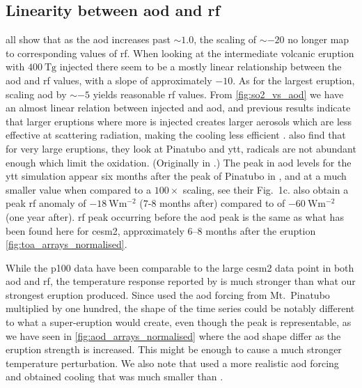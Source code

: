 \documentclass{ametsocV5}
\newcommand{\iso}[1][i]{{#1}njected \ce{SO2}}
\begin{document}
\subsection{Linearity between \ac{aod} and \ac{rf}}

 all show
that as the \ac{aod} increases past \(\sim 1.0\), the scaling of \(\sim -20\) no longer
map to corresponding values of \ac{rf}. When looking at the intermediate volcanic
eruption with \(\SI{400}{\tera\gram}\) \iso{} there seem to be a mostly linear
relationship between the \ac{aod} and \ac{rf} values, with a slope of approximately
\(-10\). As for the largest eruption, scaling \ac{aod} by \(\sim-5\) yields reasonable
\ac{rf} values. From \cref{fig:so2_vs_aod} we have an almost linear relation between
\iso{} and \ac{aod}, and previous results indicate that larger eruptions where more
 is injected creates larger aerosols which are less effective at scattering
radiation, making the cooling less efficient
\citep{english2013,timmreck2010,timmreck2018}. \citet{timmreck2010} also find that for
very large eruptions, they look at Pinatubo and \ac{ytt},  radicals are not
abundant enough which limit the  oxidation. (Originally in \citep{bekki1995}.)
The peak in \ac{aod} levels for the \ac{ytt} simulation appear six months after the peak
of Pinatubo in \citet{timmreck2010}, and at a much smaller value when compared to a
\(100\times\) scaling, see their Fig.\ 1c. \citet{timmreck2010} also obtain a peak
\ac{rf} anomaly of \(\SI{-18}{\watt\metre^{-2}}\) (\(7\)-\(8\) months after) compared to
\citet{jones2005} of \(\SI{-60}{\watt\metre^{-2}}\) (one year after). \ac{rf} peak
occurring before the \ac{aod} peak is the same as what has been found here for
\ac{cesm2}, approximately \(6\)--\(8\) months after the eruption
\cref{fig:toa_arrays_normalised}.

While the \ac{p100} data have been comparable to the large \ac{cesm2} data point in both
\ac{aod} and \ac{rf}, the temperature response reported by \citet{jones2005} is much
stronger than what our strongest eruption produced. Since \citet{jones2005} used the
\ac{aod} forcing from Mt.\ Pinatubo multiplied by one hundred, the shape of the time
series could be notably different to what a super-eruption would create, even though the
peak is representable, as we have seen in \cref{fig:aod_arrays_normalised} where the
\ac{aod} shape differ as the eruption strength is increased. This might be enough to
cause a much stronger temperature perturbation. We also note that \citet{timmreck2010}
used a more realistic \ac{aod} forcing and obtained cooling that was much smaller than
\citet{jones2005}.
\end{document}
